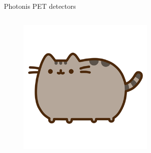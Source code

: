 \begin{columnframe}{Photonis PET detectors}
    \begin{column}{0.5\textwidth}
        \begin{figure}
            \centering
            \includegraphics[width=0.6\textwidth, frame]{images/pusheen.png}
        \end{figure}
    \end{column}
    \begin{column}{0.5\textwidth}
    \end{column}
\end{columnframe}

